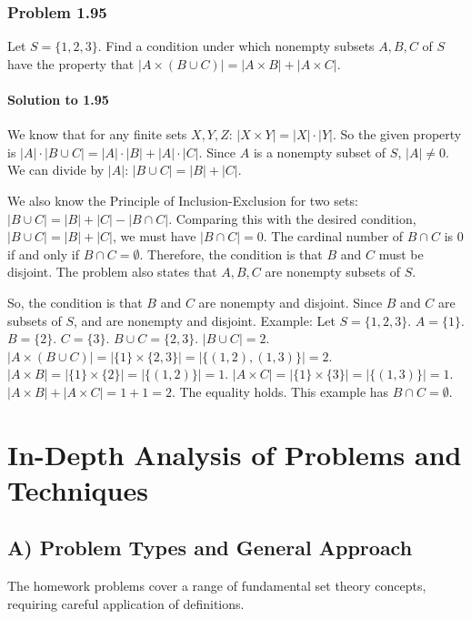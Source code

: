 \documentclass{article}
\begin{document}
\begin{itemize}
\begin{itemize}
\begin{itemize}
\subsubsection*{Problem 1.95}
Let $S = \{1, 2, 3\}$. Find a condition under which nonempty subsets $A, B, C$ of $S$ have the property that $|A \times (B \cup C)| = |A \times B| + |A \times C|$.

\paragraph*{Solution to 1.95}
We know that for any finite sets $X, Y, Z$:
$|X \times Y| = |X| \cdot |Y|$.
So the given property is $|A| \cdot |B \cup C| = |A| \cdot |B| + |A| \cdot |C|$.
Since $A$ is a nonempty subset of $S$, $|A| \neq 0$. We can divide by $|A|$:
$|B \cup C| = |B| + |C|$.

We also know the Principle of Inclusion-Exclusion for two sets:
$|B \cup C| = |B| + |C| - |B \cap C|$.
Comparing this with the desired condition, $|B \cup C| = |B| + |C|$, we must have $|B \cap C| = 0$.
The cardinal number of $B \cap C$ is 0 if and only if $B \cap C = \emptyset$.
Therefore, the condition is that $B$ and $C$ must be disjoint.
The problem also states that $A, B, C$ are nonempty subsets of $S$.

So, the condition is that $B$ and $C$ are nonempty and disjoint.
Since $B$ and $C$ are subsets of $S$, and are nonempty and disjoint.
Example: Let $S=\{1,2,3\}$. $A=\{1\}$. $B=\{2\}$. $C=\{3\}$.
$B \cup C = \{2,3\}$. $|B \cup C| = 2$.
$|A \times (B \cup C)| = |\{1\} \times \{2,3\}| = |\{(1,2), (1,3)\}| = 2$.
$|A \times B| = |\{1\} \times \{2\}| = |\{(1,2)\}| = 1$.
$|A \times C| = |\{1\} \times \{3\}| = |\{(1,3)\}| = 1$.
$|A \times B| + |A \times C| = 1 + 1 = 2$.
The equality holds. This example has $B \cap C = \emptyset$.

\section{In-Depth Analysis of Problems and Techniques}

\subsection{A) Problem Types and General Approach}
The homework problems cover a range of fundamental set theory concepts, requiring careful application of definitions.


\end{itemize}
\end{itemize}
\end{itemize}
\end{document}
